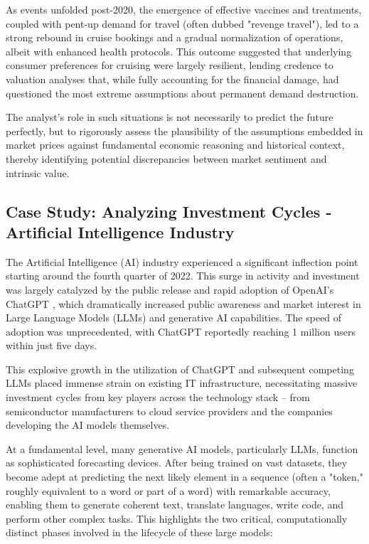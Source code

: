 As events unfolded post-2020, the emergence of effective vaccines and treatments, coupled with pent-up demand for travel (often dubbed "revenge travel"), led to a strong rebound in cruise bookings and a gradual normalization of operations, albeit with enhanced health protocols. This outcome suggested that underlying consumer preferences for cruising were largely resilient, lending credence to valuation analyses that, while fully accounting for the financial damage, had questioned the most extreme assumptions about permanent demand destruction.

The analyst's role in such situations is not necessarily to predict the future perfectly, but to rigorously assess the plausibility of the assumptions embedded in market prices against fundamental economic reasoning and historical context, thereby identifying potential discrepancies between market sentiment and intrinsic value.

\subsection{Case Study: Analyzing Investment Cycles - Artificial Intelligence Industry} \label{subsec:case_study_ai}
The Artificial Intelligence (AI) industry experienced a significant inflection point starting around the fourth quarter of 2022. This surge in activity and investment was largely catalyzed by the public release and rapid adoption of OpenAI's ChatGPT \parencite{openai2022chatgpt}, which dramatically increased public awareness and market interest in Large Language Models (LLMs) and generative AI capabilities. The speed of adoption was unprecedented, with ChatGPT reportedly reaching 1 million users within just five days.

This explosive growth in the utilization of ChatGPT and subsequent competing LLMs placed immense strain on existing IT infrastructure, necessitating massive investment cycles from key players across the technology stack – from semiconductor manufacturers to cloud service providers and the companies developing the AI models themselves.

At a fundamental level, many generative AI models, particularly LLMs, function as sophisticated forecasting devices. After being trained on vast datasets, they become adept at predicting the next likely element in a sequence (often a "token," roughly equivalent to a word or part of a word) with remarkable accuracy, enabling them to generate coherent text, translate languages, write code, and perform other complex tasks. This highlights the two critical, computationally distinct phases involved in the lifecycle of these large models:

